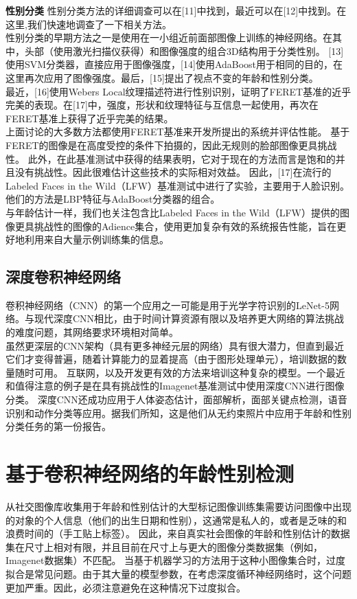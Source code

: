 \documentclass{article}
\begin{document}
\textbf{性别分类}
性别分类方法的详细调查可以在[11]中找到，最近可以在[12]中找到。在这里,我们快速地调查了一下相关方法。\\

性别分类的早期方法之一是使用在一小组近前面部图像上训练的神经网络。在其中，头部（使用激光扫描仪获得）和图像强度的组合3D结构用于分类性别。 
[13]使用SVM分类器，直接应用于图像强度，[14]使用AdaBoost用于相同的目的，在这里再次应用了图像强度。最后，[15]提出了视点不变的年龄和性别分类。\\

最近，[16]使用Webers Local纹理描述符进行性别识别，证明了FERET基准的近乎完美的表现。在[17]中，强度，形状和纹理特征与互信息一起使用，再次在FERET基准上获得了近乎完美的结果。\\

上面讨论的大多数方法都使用FERET基准来开发所提出的系统并评估性能。 基于FERET的图像是在高度受控的条件下拍摄的，因此无规则的脸部图像更具挑战性。
此外，在此基准测试中获得的结果表明，它对于现在的方法而言是饱和的并且没有挑战性。因此很难估计这些技术的实际相对效益。
因此，[17]在流行的Labeled Faces in the Wild（LFW）基准测试中进行了实验，主要用于人脸识别。他们的方法是LBP特征与AdaBoost分类器的组合。\\

与年龄估计一样，我们也关注包含比Labeled Faces in the Wild（LFW）提供的图像更具挑战性的图像的Adience集合，使用更加复杂有效的系统报告性能，旨在更好地利用来自大量示例训练集的信息。\\
\subsection{深度卷积神经网络}

卷积神经网络（CNN）的第一个应用之一可能是用于光学字符识别的LeNet-5网络。与现代深度CNN相比，由于时间计算资源有限以及培养更大网络的算法挑战的难度问题，其网络要求环境相对简单。\\

虽然更深层的CNN架构（具有更多神经元层的网络）具有很大潜力，但直到最近它们才变得普遍，随着计算能力的显着提高（由于图形处理单元），培训数据的数量随时可用。
互联网，以及开发更有效的方法来培训这种复杂的模型。一个最近和值得注意的例子是在具有挑战性的Imagenet基准测试中使用深度CNN进行图像分类。
深度CNN还成功应用于人体姿态估计，面部解析，面部关键点检测，语音识别和动作分类等应用。据我们所知，这是他们从无约束照片中应用于年龄和性别分类任务的第一份报告。\\

\section{基于卷积神经网络的年龄性别检测}
从社交图像库收集用于年龄和性别估计的大型标记图像训练集需要访问图像中出现的对象的个人信息（他们的出生日期和性别），这通常是私人的，或者是乏味的和浪费时间的（手工贴上标签）。
因此，来自真实社会图像的年龄和性别估计的数据集在尺寸上相对有限，并且目前在尺寸上与更大的图像分类数据集（例如，Imagenet数据集）不匹配。
当基于机器学习的方法用于这种小图像集合时，过度拟合是常见问题。由于其大量的模型参数，在考虑深度循环神经网络时，这个问题更加严重。因此，必须注意避免在这种情况下过度拟合。\\
\end{document}
